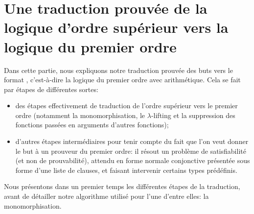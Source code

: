 \section{Une traduction prouvée de la logique d'ordre supérieur vers la
  logique du premier ordre}
\label{sec:traduction}

Dans cette partie, nous expliquons notre traduction prouvée des buts
\holfour vers le format \tff, c'est-à-dire la logique du premier ordre
avec arithmétique. Cela se fait par étapes de différentes sortes:
\begin{itemize}
\item des étapes effectivement de traduction de l'ordre supérieur vers
  le premier ordre (notamment la monomorphisation, le $\lambda$-lifting
  et la suppression des fonctions passées en arguments d'autres
  fonctions);
\item d'autres étapes intermédiaires pour tenir compte du fait que l'on
  veut donner le but à un prouveur du premier ordre: il résout un
  problème de satisfiabilité (et non de prouvabilité), attendu en forme
  normale conjonctive présentée sous forme d'une liste de clauses, et
  faisant intervenir certains types prédéfinis.
\end{itemize}
Nous présentons dans un premier temps les différentes étapes de la
traduction, avant de détailler notre algorithme utilisé pour l'une
d'entre elles: la monomorphisation.


